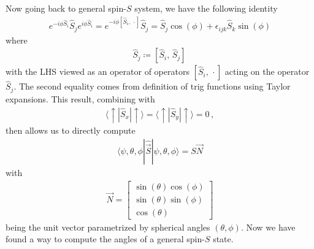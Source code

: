 \documentclass[11pt, onesided]{book}
\theoremstyle{break}
\theoremstyle{break}
\newcommand{\bmat}[1]{\begin{bmatrix} #1 \end{bmatrix}}
\begin{document}
Now going back to general spin-$S$ system, we have the following identity
\begin{align*}
e^{-i\phi \hat{S}_i}\hat{S}_j e^{i\phi \hat{S}_i} = e^{-i\phi[\hat{S}_i,\,\cdot]}\hat{S}_j = \hat{S}_j \cos(\phi) + \epsilon_{ijk}\hat{S}_k \sin(\phi) \tag{*}
\end{align*}
where 
\begin{align*}
[\hat{S}_i,\,\cdot]\hat{S}_j \coloneqq [\hat{S}_i,\, \hat{S}_j]\,
\end{align*}
with the LHS viewed as an operator of operators $[\hat{S}_i,\,\cdot]$ acting on the operator $\hat{S}_j$. The second equality comes from definition of trig functions using Taylor expansions. This result, combining with 
\begin{align*}
\langle \uparrow |\hat{S}_x|\uparrow \rangle=
\langle \uparrow |\hat{S}_y|\uparrow \rangle  = 0\,,
\end{align*}
then allows us to directly compute
\begin{align*}
\langle \psi, \theta, \phi|\hat{\vec{S}}|\psi,\theta, \phi\rangle = S\vec{N}
\end{align*}
with
\begin{align*}
\vec{N} = \bmat{\sin(\theta) \cos(\phi) \\\sin(\theta)\sin(\phi)\\\cos(\theta)}
\end{align*}
being the unit vector parametrized by spherical angles $(\theta, \phi)$. Now we have found a way to compute the angles of a general spin-$S$ state. \\
\end{document}
